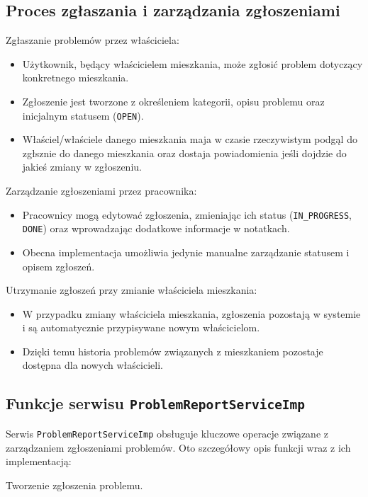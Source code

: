 \subsection{Proces zgłaszania i zarządzania zgłoszeniami}

Zgłaszanie problemów przez właściciela:
\begin{itemize}
    \item Użytkownik, będący właścicielem mieszkania, może zgłosić problem dotyczący konkretnego mieszkania. 
    \item Zgłoszenie jest tworzone z określeniem kategorii, opisu problemu oraz inicjalnym statusem (\texttt{OPEN}).
		\item Właściel/właściele danego mieszkania maja w czasie rzeczywistym podgąl do zgłsznie do danego mieszkania oraz dostaja powiadomienia jeśli dojdzie  do jakieś zmiany w zgłoszeniu.
\end{itemize}

Zarządzanie zgłoszeniami przez pracownika:
\begin{itemize}
    \item Pracownicy mogą edytować zgłoszenia, zmieniając ich status (\texttt{IN\_PROGRESS}, \texttt{DONE}) oraz wprowadzając dodatkowe informacje w notatkach.
    \item Obecna implementacja umożliwia jedynie manualne zarządzanie statusem i opisem zgłoszeń.
\end{itemize}

Utrzymanie zgłoszeń przy zmianie właściciela mieszkania:
\begin{itemize}
    \item W przypadku zmiany właściciela mieszkania, zgłoszenia pozostają w systemie i są automatycznie przypisywane nowym właścicielom.
    \item Dzięki temu historia problemów związanych z mieszkaniem pozostaje dostępna dla nowych właścicieli.
\end{itemize}


\subsection{Funkcje serwisu \texttt{ProblemReportServiceImp}}

Serwis \texttt{ProblemReportServiceImp} obsługuje kluczowe operacje związane z zarządzaniem zgłoszeniami problemów. Oto szczegółowy opis funkcji wraz z ich implementacją:

Tworzenie zgłoszenia problemu.

